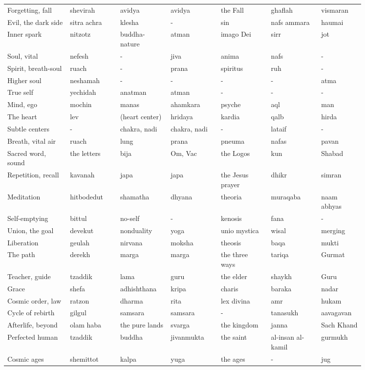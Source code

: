 {\begin{longtable}{L{0.15\linewidth} L{0.12\linewidth} L{0.12\linewidth} L{0.12\linewidth} L{0.12\linewidth} L{0.12\linewidth} L{0.10\linewidth}}
Forgetting, fall & shevirah & avidya & avidya & the Fall & ghaflah & vismaran \\
Evil, the dark side & sitra achra & klesha & - & sin & nafs ammara & haumai \\
Inner spark & nitzotz & buddha-nature & atman & imago Dei & sirr & jot \\
Soul, vital & nefesh & - & jiva & anima & nafs & - \\
Spirit, breath-soul & ruach & - & prana & spiritus & ruh & - \\
Higher soul & neshamah & - & - & - & - & atma \\
True self & yechidah & anatman & atman & - & - & - \\
Mind, ego & mochin & manas & ahamkara & psyche & aql & man \\
The heart & lev & (heart center) & hridaya & kardia & qalb & hirda \\
Subtle centers & - & chakra, nadi & chakra, nadi & - & lataif & - \\
Breath, vital air & ruach & lung & prana & pneuma & nafas & pavan \\
Sacred word, sound & the letters & bija & Om, Vac & the Logos & kun & Shabad \\
Repetition, recall & kavanah & japa & japa & the Jesus prayer & dhikr & simran \\
Meditation & hitbodedut & shamatha & dhyana & theoria & muraqaba & naam abhyas \\
Self-emptying & bittul & no-self & - & kenosis & fana & - \\
Union, the goal & devekut & nonduality & yoga & unio mystica & wisal & merging \\
Liberation & geulah & nirvana & moksha & theosis & baqa & mukti \\
The path & derekh & marga & marga & the three ways & tariqa & Gurmat \\
Teacher, guide & tzaddik & lama & guru & the elder & shaykh & Guru \\
Grace & shefa & adhishthana & kripa & charis & baraka & nadar \\
Cosmic order, law & ratzon & dharma & rita & lex divina & amr & hukam \\
Cycle of rebirth & gilgul & samsara & samsara & - & tanasukh & aavagavan \\
Afterlife, beyond & olam haba & the pure lands & svarga & the kingdom & janna & Sach Khand \\
Perfected human & tzaddik & buddha & jivanmukta & the saint & al-insan al-kamil & gurmukh \\
Cosmic ages & shemittot & kalpa & yuga & the ages & - & jug \\
\bottomrule
\end{longtable}
}

